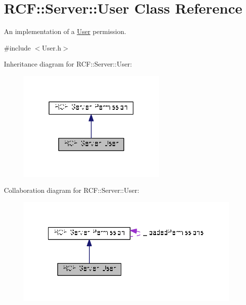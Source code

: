 \hypertarget{class_r_c_f_1_1_server_1_1_user}{}\section{R\+C\+F\+:\+:Server\+:\+:User Class Reference}
\label{class_r_c_f_1_1_server_1_1_user}


An implementation of a \hyperlink{class_r_c_f_1_1_server_1_1_user}{User} permission.  




{\ttfamily \#include $<$User.\+h$>$}



Inheritance diagram for R\+C\+F\+:\+:Server\+:\+:User\+:\nopagebreak
\begin{figure}[H]
\begin{center}
\leavevmode
\includegraphics[width=210pt]{class_r_c_f_1_1_server_1_1_user__inherit__graph}
\end{center}
\end{figure}


Collaboration diagram for R\+C\+F\+:\+:Server\+:\+:User\+:\nopagebreak
\begin{figure}[H]
\begin{center}
\leavevmode
\includegraphics[width=327pt]{class_r_c_f_1_1_server_1_1_user__coll__graph}
\end{center}
\end{figure}
